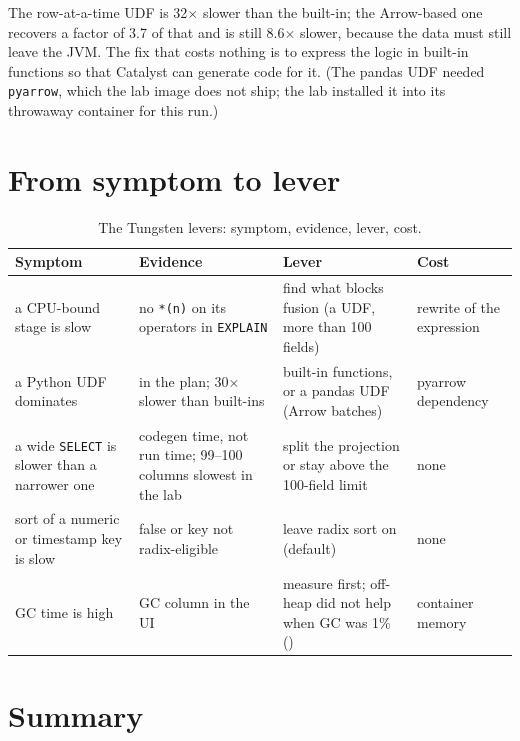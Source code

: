 The row-at-a-time UDF is 32$\times$ slower than the built-in; the Arrow-based one
recovers a factor of 3.7 of that and is still 8.6$\times$ slower, because the data
must still leave the JVM. The fix that costs nothing is to express the logic in
built-in functions so that Catalyst can generate code for it. (The pandas UDF
needed \texttt{pyarrow}, which the lab image does not ship; the lab installed it
into its throwaway container for this run.)

\section{From symptom to lever}
\label{sec:tungsten-levers}

\begin{table}[htbp]
\centering\footnotesize
\renewcommand{\arraystretch}{1.25}
\begin{tabular}{@{}P{3.1cm}P{3.7cm}P{4.1cm}P{3.2cm}@{}}
\toprule
\textbf{Symptom} & \textbf{Evidence} & \textbf{Lever} & \textbf{Cost} \\
\midrule
a CPU-bound stage is slow & no \texttt{*(n)} on its operators in \texttt{EXPLAIN} & find what blocks fusion (a UDF, more than 100 fields) & rewrite of the expression \\
a Python UDF dominates &  in the plan; 30$\times$ slower than built-ins & built-in functions, or a pandas UDF (Arrow batches) & pyarrow dependency \\
a wide \texttt{SELECT} is slower than a narrower one & codegen time, not run time; 99--100 columns slowest in the lab & split the projection or stay above the 100-field limit & none \\
sort of a numeric or timestamp key is slow &  false or key not radix-eligible & leave radix sort on (default) & none \\
GC time is high & GC column in the UI & measure first; off-heap did not help when GC was 1\% () & container memory \\
\bottomrule
\end{tabular}
\caption{The Tungsten levers: symptom, evidence, lever, cost.}
\label{tab:tungsten-levers}
\end{table}

\section{Summary}
\label{sec:tungsten-summary}

